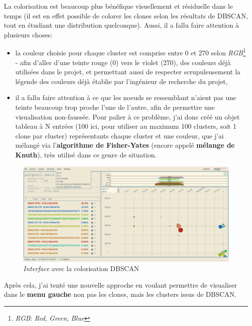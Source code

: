 \documentclass[pdftex,12pt,a4paper]{report}
\begin{document}
\begin{spacing}{1.2}
La colorisation est beaucoup plus bénéfique visuellement et résiduelle dans le temps (il est en effet possible de colorer les clones selon les résultats de DBSCAN, tout en étudiant une distribution quelconque).
\newline
Aussi, il a fallu faire attention à plusieurs choses:
	\begin{itemize}
		\item{la couleur choisie pour chaque cluster est comprise entre 0 et 270 selon \textit{RGB}\footnote{\textit{RGB}: \textit{Red}, \textit{Green}, \textit{Blue}} - afin d'aller d'une teinte rouge (0) vers le violet (270), des couleurs déjà utilisées dans le projet, et permettant aussi de respecter scrupuleusement la légende des couleurs déjà établie par l'ingénieur de recherche du projet,}
		\item{il a fallu faire attention à ce que les noeuds se ressemblant n'aient pas une teinte beaucoup trop proche l'une de l'autre, afin de permettre une visualisation non-faussée.
			\newline
			Pour palier à ce problème, j'ai donc créé un objet tableau à N entrées (100 ici, pour utiliser au maximum 100 clusters, soit 1 clone par cluster) représentants chaque cluster et une couleur, que j'ai mélangé via l'\textbf{algorithme de Fisher-Yates} (encore appelé \textbf{mélange de Knuth}), très utilisé dans ce genre de situation.}
	\end{itemize}

\begin{figure}[H]
\begin{center}
	\includegraphics[scale=0.35]{img/DBSCAN-Color-Ex.jpg}
\end{center}
\caption{\textit{Interface} avec la colorisation DBSCAN}
\end{figure}

Après cela, j'ai tenté une nouvelle approche en voulant permettre de visualiser dans le \textbf{menu gauche} non pas les clones, mais les clusters issus de DBSCAN.


\end{spacing}
\end{document}
